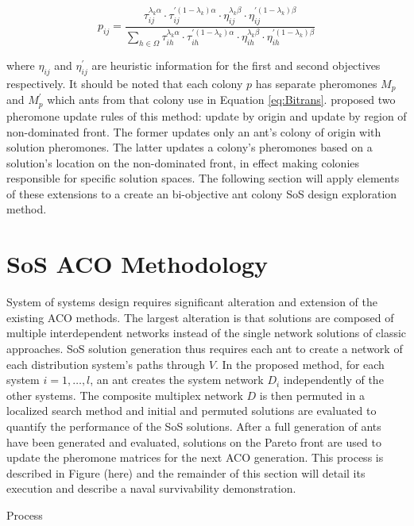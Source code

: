 \documentclass[preprint,12pt]{elsarticle}
\begin{document}
\begin{equation}
p_{ij}=\frac{\tau_{ij}^{\lambda_k\alpha}\cdot\tau_{ij}^{'(1-\lambda_k)\alpha}\cdot\eta_{ij}^{\lambda_k\beta}\cdot\eta_{ij}^{'(1-\lambda_k)\beta}}{\sum_{h\in\Omega}\tau_{ih}^{\lambda_k\alpha}\cdot\tau_{ih}^{'(1-\lambda_k)\alpha}\cdot\eta_{ih}^{\lambda_k\beta}\cdot\eta_{ih}^{'(1-\lambda_k)\beta}}
\label{eq:Bitrans}
\end{equation}

\noindent where $\eta_{ij}$ and $\eta^{'}_{ij}$ are heuristic information for the first and second objectives respectively. It should be noted that each colony $p$ has separate pheromones $M_p$ and $M^{'}_p$ which ants from that colony use in Equation \ref{eq:Bitrans}. \cite{Iredi2001} proposed two pheromone update rules of this method: update by origin and update by region of non-dominated front. The former updates only an ant's colony of origin with solution pheromones. The latter updates a colony's pheromones based on a solution's location on the non-dominated front, in effect making colonies responsible for specific solution spaces. The following section will apply elements of these extensions to a create an bi-objective ant colony SoS design exploration method.

\section{SoS ACO Methodology}
System of systems design requires significant alteration and extension of the existing ACO methods. The largest alteration is that solutions are composed of multiple interdependent networks instead of the single network solutions of classic approaches. SoS solution generation thus requires each ant to create a network of each distribution system's paths through $V$. In the proposed method, for each system $i=1, \ldots, l$, an ant creates the system network $D_i$ independently of the other systems. The composite multiplex network $D$ is then permuted in a localized search method and initial and permuted solutions are evaluated to quantify the performance of the SoS solutions. After a full generation of ants have been generated and evaluated, solutions on the Pareto front are used to update the pheromone matrices for the next ACO generation. This process is described in Figure (here) and the remainder of this section will detail its execution and describe a naval survivability demonstration.  

Process
\end{document}
